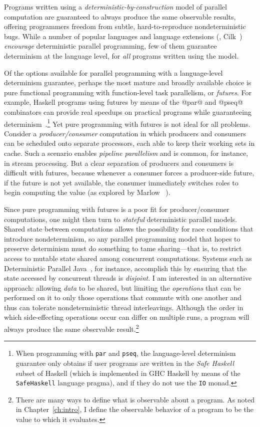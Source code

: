 Programs written using a \emph{deterministic-by-construction} model of
parallel computation are guaranteed to always produce the same
observable results, offering programmers freedom from subtle,
hard-to-reproduce nondeterministic bugs.  While a number of popular
languages and language extensions (\eg, Cilk~\cite{cilk}) \emph{encourage} deterministic parallel programming, few
of them guarantee determinism at the language level, for \emph{all}
programs written using the model.

Of the options available for parallel programming with a
language-level determinism guarantee, perhaps the most mature and
broadly available choice is pure functional programming with
function-level task parallelism, or \emph{futures}.  For example,
Haskell programs using futures by means of the @par@ and @pseq@
combinators can provide real speedups on practical programs while
guaranteeing determinism~\cite{marlow-par}.\footnote{When programming
  with \lstinline|par| and \lstinline|pseq|, the language-level
  determinism guarantee only obtains if user programs are written in
  the \emph{Safe Haskell}~\cite{safe-haskell} subset of Haskell (which
  is implemented in GHC Haskell by means of the
  \lstinline|SafeHaskell| language pragma), and if they do not use the
  \lstinline|IO| monad.}  Yet pure programming with futures is not
ideal for all problems.  Consider a \emph{producer/consumer}
computation in which producers and consumers can be scheduled onto
separate processors, each able to keep their working sets in cache.
Such a scenario enables \emph{pipeline parallelism} and is common, for
instance, in stream processing.  But a clear separation of producers
and consumers is difficult with futures, because whenever a consumer
forces a producer-side future, if the future is not yet available, the
consumer immediately switches roles to begin computing the value (as
explored by Marlow \etal~\cite{monad-par}).

Since pure programming with futures is a poor fit for
producer/consumer computations, one might then turn to \emph{stateful}
deterministic parallel models.  Shared state between computations
allows the possibility for race conditions that introduce
nondeterminism, so any parallel programming model that hopes to
preserve determinism must do something to tame sharing---that is, to
restrict access to mutable state shared among concurrent computations.
Systems such as Deterministic Parallel Java~\cite{dpj-oopsla,
  dpj-hotpar09}, for instance, accomplish this by ensuring that the
state accessed by concurrent threads is \emph{disjoint}.  I am
interested in an alternative approach: allowing \emph{data} to be
shared, but limiting the \emph{operations} that can be performed on it
to only those operations that commute with one another and thus can
tolerate nondeterministic thread interleavings.  Although the order in
which side-effecting operations occur can differ on multiple runs, a
program will always produce the same observable result.\footnote{There
  are many ways to define what is observable about a program. As noted
  in Chapter~\ref{ch:intro}, I define the observable behavior of a
  program to be the value to which it evaluates.}

